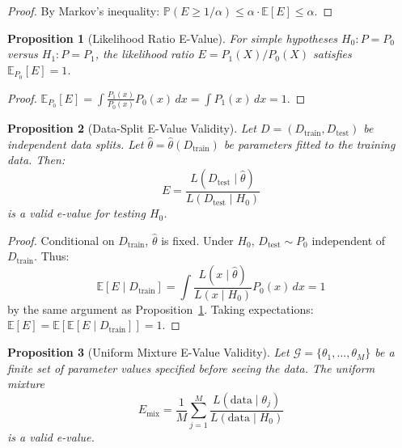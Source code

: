 \documentclass[11pt,a4paper]{article}
\newtheorem{proposition}{Proposition}
\newcommand{\E}{\mathbb{E}}
\newcommand{\Prob}{\mathbb{P}}
\begin{document}
\begin{proof}
By Markov's inequality: $\Prob(E \geq 1/\alpha) \leq \alpha \cdot \E[E] \leq \alpha$.
\end{proof}

\begin{proposition}[Likelihood Ratio E-Value]
\label{prop:lr}
For simple hypotheses $H_0: P = P_0$ versus $H_1: P = P_1$, the likelihood ratio $E = P_1(X)/P_0(X)$ satisfies $\E_{P_0}[E] = 1$.
\end{proposition}

\begin{proof}
$\E_{P_0}[E] = \int \frac{P_1(x)}{P_0(x)} P_0(x) \, dx = \int P_1(x) \, dx = 1$.
\end{proof}

\begin{proposition}[Data-Split E-Value Validity]
\label{prop:split}
Let $D = (D_{\text{train}}, D_{\text{test}})$ be independent data splits. Let $\hat{\theta} = \hat{\theta}(D_{\text{train}})$ be parameters fitted to the training data. Then:
\begin{equation}
E = \frac{L(D_{\text{test}} \mid \hat{\theta})}{L(D_{\text{test}} \mid H_0)}
\end{equation}
is a valid e-value for testing $H_0$.
\end{proposition}

\begin{proof}
Conditional on $D_{\text{train}}$, $\hat{\theta}$ is fixed. Under $H_0$, $D_{\text{test}} \sim P_0$ independent of $D_{\text{train}}$. Thus:
\begin{equation}
\E[E \mid D_{\text{train}}] = \int \frac{L(x \mid \hat{\theta})}{L(x \mid H_0)} P_0(x) \, dx = 1
\end{equation}
by the same argument as Proposition~\ref{prop:lr}. Taking expectations: $\E[E] = \E[\E[E \mid D_{\text{train}}]] = 1$.
\end{proof}

\begin{proposition}[Uniform Mixture E-Value Validity]
\label{prop:mixture}
Let $\mathcal{G} = \{\theta_1, \ldots, \theta_M\}$ be a finite set of parameter values specified before seeing the data. The uniform mixture
\begin{equation}
E_{\text{mix}} = \frac{1}{M} \sum_{j=1}^M \frac{L(\text{data} \mid \theta_j)}{L(\text{data} \mid H_0)}
\end{equation}
is a valid e-value.
\end{proposition}
\end{document}
